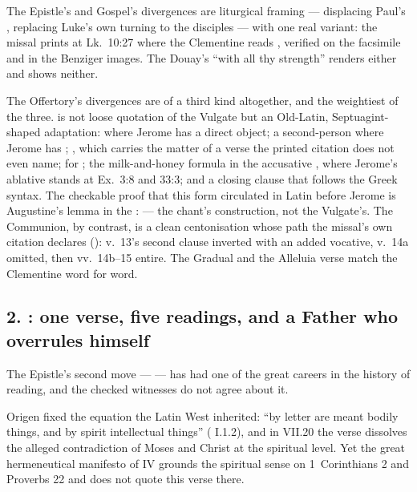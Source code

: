 The Epistle's and Gospel's divergences are liturgical framing --- 
displacing Paul's ,  replacing Luke's own turning to the disciples --- with one
real variant: the missal prints  at Lk.~10:27
where the Clementine reads , verified on
the facsimile and in the Benziger images. The Douay's ``with all
thy strength'' renders either and shows neither.

The Offertory's divergences are of a third kind altogether, and the
weightiest of the three.  is not loose quotation of
the Vulgate but an Old-Latin, Septuagint-shaped adaptation:  where Jerome has a direct object; a second-person 
where Jerome has ; ,
which carries the matter of a verse the printed citation does not even name;
 for ; the milk-and-honey formula in the accusative
, where Jerome's ablative  stands at
Ex.~3:8 and 33:3; and a closing clause that follows the Greek syntax. The
checkable proof that this form circulated in Latin before Jerome is
Augustine's lemma in the :  --- the
chant's construction, not the Vulgate's. The Communion, by contrast, is a
clean centonisation whose path the missal's own citation declares
(): v.~13's second clause inverted with an added vocative,
v.~14a omitted, then vv.~14b--15 entire. The Gradual and the Alleluia verse
match the Clementine word for word.

\subsection*{2. : one verse, five readings, and a Father who overrules himself}

The Epistle's second move ---  --- has had one of the great careers in the
history of reading, and the checked witnesses do not agree about it.

Origen fixed the equation the Latin West inherited: ``by letter are meant
bodily things, and by spirit intellectual things'' (
I.1.2), and in  VII.20 the verse dissolves the alleged
contradiction of Moses and Christ at the spiritual level. Yet the great
hermeneutical manifesto of  IV grounds the spiritual sense on 1~Corinthians 2 and Proverbs 22 and does not
quote this verse there.

